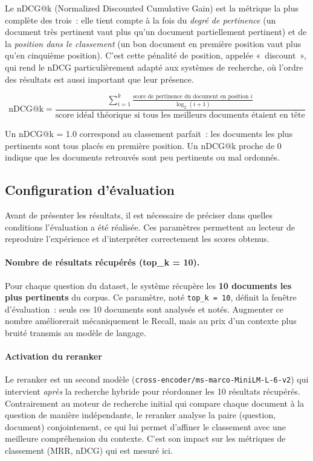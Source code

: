 Le nDCG@k (Normalized Discounted Cumulative Gain) est la métrique la plus complète des trois~: elle tient compte à la fois du \emph{degré de pertinence} (un document très pertinent vaut plus qu'un document partiellement pertinent) et de la \emph{position dans le classement} (un bon document en première position vaut plus qu'en cinquième position). C'est cette pénalité de position, appelée «~discount~», qui rend le nDCG particulièrement adapté aux systèmes de recherche, où l'ordre des résultats est aussi important que leur présence.

\[
\text{nDCG@k} = \frac{\displaystyle\sum_{i=1}^{k} \frac{\text{score de pertinence du document en position } i}{\log_2(i+1)}}{\text{score idéal théorique si tous les meilleurs documents étaient en tête}}
\]

Un nDCG@k = 1.0 correspond au classement parfait~: les documents les plus pertinents sont tous placés en première position. Un nDCG@k proche de 0 indique que les documents retrouvés sont peu pertinents ou mal ordonnés.

\subsection{Configuration d'évaluation}

Avant de présenter les résultats, il est nécessaire de préciser dans quelles conditions l'évaluation a été réalisée. Ces paramètres permettent au lecteur de reproduire l'expérience et d'interpréter correctement les scores obtenus.

\paragraph{Nombre de résultats récupérés (top\_k = 10).}
Pour chaque question du dataset, le système récupère les \textbf{10 documents les plus pertinents} du corpus. Ce paramètre, noté \texttt{top\_k = 10}, définit la fenêtre d'évaluation~: seuls ces 10 documents sont analysés et notés. Augmenter ce nombre améliorerait mécaniquement le Recall, mais au prix d'un contexte plus bruité transmis au modèle de langage.

\paragraph{Activation du reranker}
Le reranker est un second modèle (\texttt{cross-encoder/\allowbreak ms-marco-MiniLM-L-6-v2}) qui intervient \emph{après} la recherche hybride pour réordonner les 10 résultats récupérés. Contrairement au moteur de recherche initial qui compare chaque document à la question de manière indépendante, le reranker analyse la paire (question, document) conjointement, ce qui lui permet d'affiner le classement avec une meilleure compréhension du contexte. C'est son impact sur les métriques de classement (MRR, nDCG) qui est mesuré ici.

